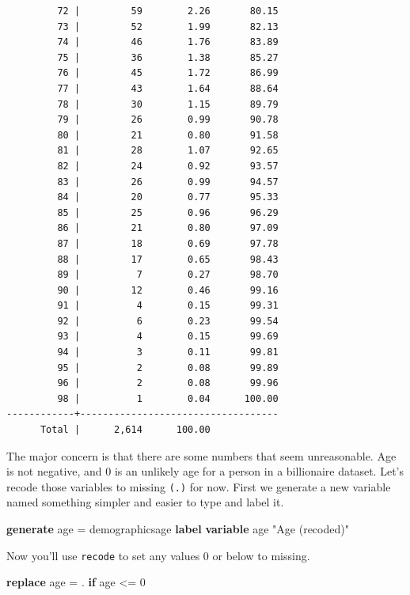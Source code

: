 \documentclass[
]{book}
\newenvironment{Shaded}{\begin{snugshade}}{\end{snugshade}}
\newcommand{\KeywordTok}[1]{\textcolor[rgb]{0.13,0.29,0.53}{\textbf{#1}}}
\newcommand{\NormalTok}[1]{#1}
\newcommand{\StringTok}[1]{\textcolor[rgb]{0.31,0.60,0.02}{#1}}
\begin{document}
\begin{verbatim}
         72 |         59        2.26       80.15
         73 |         52        1.99       82.13
         74 |         46        1.76       83.89
         75 |         36        1.38       85.27
         76 |         45        1.72       86.99
         77 |         43        1.64       88.64
         78 |         30        1.15       89.79
         79 |         26        0.99       90.78
         80 |         21        0.80       91.58
         81 |         28        1.07       92.65
         82 |         24        0.92       93.57
         83 |         26        0.99       94.57
         84 |         20        0.77       95.33
         85 |         25        0.96       96.29
         86 |         21        0.80       97.09
         87 |         18        0.69       97.78
         88 |         17        0.65       98.43
         89 |          7        0.27       98.70
         90 |         12        0.46       99.16
         91 |          4        0.15       99.31
         92 |          6        0.23       99.54
         93 |          4        0.15       99.69
         94 |          3        0.11       99.81
         95 |          2        0.08       99.89
         96 |          2        0.08       99.96
         98 |          1        0.04      100.00
------------+-----------------------------------
      Total |      2,614      100.00
\end{verbatim}

The major concern is that there are some numbers that seem unreasonable. Age is not negative, and 0 is an unlikely age for a person in a billionaire dataset. Let's recode those variables to missing \texttt{(.)} for now. First we generate a new variable named something simpler and easier to type and label it.

\begin{Shaded}
\begin{Highlighting}[]
\KeywordTok{generate}\NormalTok{ age = demographicsage}
\KeywordTok{label} \KeywordTok{variable}\NormalTok{ age }\StringTok{"Age (recoded)"}
\end{Highlighting}
\end{Shaded}

Now you'll use \texttt{recode} to set any values 0 or below to missing.

\begin{Shaded}
\begin{Highlighting}[]
\KeywordTok{replace}\NormalTok{ age = . }\KeywordTok{if}\NormalTok{ age \textless{}= 0}
\end{Highlighting}
\end{Shaded}
\end{document}
